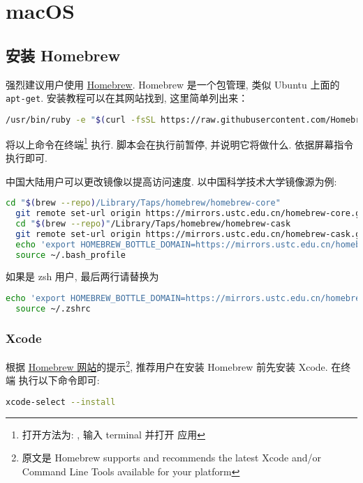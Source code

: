 
\chapter{macOS}\label{chap:macOS}

\section{安装 Homebrew}

强烈建议用户使用 \href{https://brew.sh}{Homebrew}.
Homebrew 是一个包管理, 类似 Ubuntu 上面的 \texttt{apt-get}.
安装教程可以在其网站找到, 这里简单列出来：
\begin{lstlisting}[language=bash]
  /usr/bin/ruby -e "$(curl -fsSL https://raw.githubusercontent.com/Homebrew/install/master/install)"
\end{lstlisting}
将以上命令在\textsf{终端}\footnote{%
  打开方法为: \keys{\cmdmac + \SPACE}, 输入 terminal 并打开  应用}%
执行.
脚本会在执行前暂停, 并说明它将做什么. 依据屏幕指令执行即可.

中国大陆用户可以更改镜像以提高访问速度. 以中国科学技术大学镜像源为例:
\begin{lstlisting}[language=bash]
  cd "$(brew --repo)/Library/Taps/homebrew/homebrew-core"
  git remote set-url origin https://mirrors.ustc.edu.cn/homebrew-core.git
  cd "$(brew --repo)"/Library/Taps/homebrew/homebrew-cask
  git remote set-url origin https://mirrors.ustc.edu.cn/homebrew-cask.git
  echo 'export HOMEBREW_BOTTLE_DOMAIN=https://mirrors.ustc.edu.cn/homebrew-bottles' >> ~/.bash_profile
  source ~/.bash_profile
\end{lstlisting}
如果是 zsh 用户, 最后两行请替换为
\begin{lstlisting}[language=bash]
  echo 'export HOMEBREW_BOTTLE_DOMAIN=https://mirrors.ustc.edu.cn/homebrew-bottles' >> ~/.zshrc
  source ~/.zshrc
\end{lstlisting}

\subsection{Xcode}

根据 \href{https://docs.brew.sh/Xcode\#supported-xcode-versions}{Homebrew 网站}的提示\footnote{原文是 Homebrew supports and recommends the latest Xcode and/or Command Line Tools available for your platform},
推荐用户在安装 Homebrew 前先安装 Xcode.
在\textsf{终端} 执行以下命令即可:
\begin{lstlisting}[language=bash]
  xcode-select --install
\end{lstlisting}

